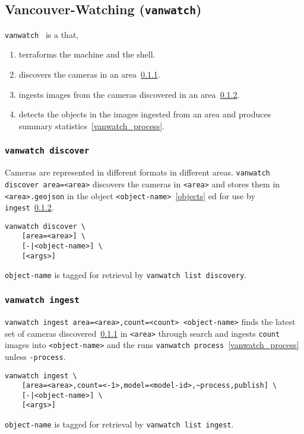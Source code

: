 \subsection{Vancouver-Watching (\texttt{vanwatch})}
\label{vanwatch}

\texttt{vanwatch}~ is a  that,
%
\begin{enumerate}
    \item{terraforms the machine and the shell.}
    \item{discovers the cameras in an area~\ref{vanwatch_discover}.}
    \item{ingests images from the cameras discovered in an area~\ref{vanwatch_ingest}.}
    \item{detects the objects in the images ingested from an area and produces summary statistics~\ref{vanwatch_process}.}
\end{enumerate}

\subsubsection{\texttt{vanwatch discover}}
\label{vanwatch_discover}

Cameras are represented in different formats in different areas. \texttt{vanwatch discover area=<area>} discovers the cameras in \texttt{<area>} and stores them in \texttt{<area>.geojson} in the object \texttt{<object-name>}~\ref{objects} ed for use by \texttt{ingest}~\ref{vanwatch_ingest}.
%
\begin{verbatim}
vanwatch discover \
    [area=<area>] \
    [-|<object-name>] \
    [<args>]
\end{verbatim}
%
\texttt{object-name} is tagged for retrieval by \texttt{vanwatch list discovery}. 

\subsubsection{\texttt{vanwatch ingest}}
\label{vanwatch_ingest}

\texttt{vanwatch ingest area=<area>,count=<count> <object-name>} finds the latest set of cameras discovered~\ref{vanwatch_discover} in \texttt{<area>} through  search and ingests \texttt{count} images into \texttt{<object-name>} and the runs \texttt{vanwatch process}~\ref{vanwatch_process} unless \texttt{-process}.
%
\begin{verbatim}
vanwatch ingest \
    [area=<area>,count=<-1>,model=<model-id>,~process,publish] \
    [-|<object-name>] \
    [<args>]
\end{verbatim}
%
\texttt{object-name} is tagged for retrieval by \texttt{vanwatch list ingest}. 

